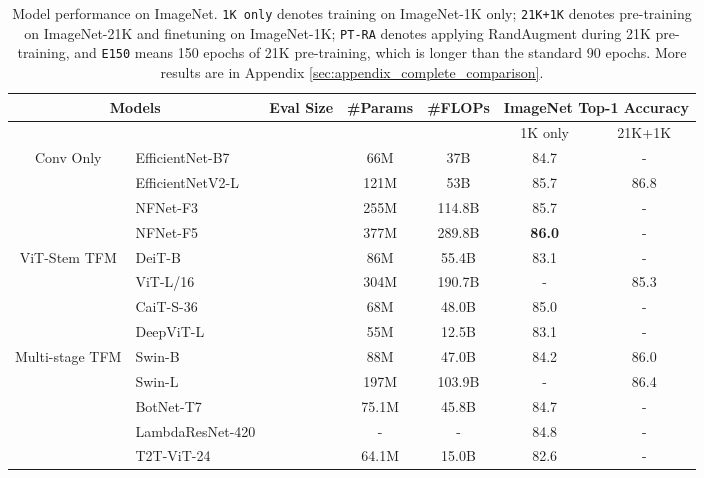\documentclass{article}
\begin{document}
\begin{table}[!ht]
\small
    \centering
    \vspace{-1em}
    \caption{Model performance on ImageNet.  \texttt{1K only} denotes training on ImageNet-1K only; \texttt{21K+1K} denotes pre-training on ImageNet-21K and finetuning on ImageNet-1K; \texttt{PT-RA} denotes applying RandAugment during 21K pre-training, and \texttt{E150} means 150 epochs of 21K pre-training, which is longer than the standard 90 epochs. More results are in Appendix \ref{sec:appendix_complete_comparison}.}
    \begin{tabular}{c l c c c c c}
        \toprule
        \multicolumn{2}{c}{\bf Models} & \bf Eval Size & \bf \#Params & \bf \#FLOPs & \multicolumn{2}{c}{\bf ImageNet Top-1 Accuracy} \\
        \midrule
        \multicolumn{5}{c}{} & 1K only & 21K+1K \vspace{0.5em} \\
        \multirow{3}{*}{Conv Only}
        & EfficientNet-B7 &  & 66M & 37B & 84.7 & -\\
        & EfficientNetV2-L &  & 121M & 53B & 85.7 & 86.8\\
        & NFNet-F3 &  & 255M & 114.8B & 85.7 & - \\
        & NFNet-F5 &  & 377M & 289.8B & \bf 86.0 & - \\
        \cmidrule(r){1-2} \cmidrule(lr){3-3} \cmidrule(lr){4-5} \cmidrule(l){6-6} \cmidrule(l){7-7}
        \multirow{4}{*}{ViT-Stem TFM} 
        & DeiT-B  &  & 86M  & 55.4B & 83.1 & - \\
        & ViT-L/16 &  & 304M  & 190.7B & -  & 85.3 \\
        & CaiT-S-36 &  & 68M & 48.0B & 85.0 & - \\
        & DeepViT-L &  & 55M & 12.5B &  83.1 & - \\
        \cmidrule(r){1-2} \cmidrule(lr){3-3} \cmidrule(lr){4-5} \cmidrule(l){6-6} \cmidrule(l){7-7}
        \multirow{3}{*}{Multi-stage TFM} 
        & Swin-B  &  & 88M  & 47.0B & 84.2  & 86.0 \\
        & Swin-L  &  & 197M & 103.9B & -  & 86.4 \\
        \cmidrule(r){1-2} \cmidrule(lr){3-3} \cmidrule(lr){4-5} \cmidrule(l){6-6} \cmidrule(l){7-7}
        \multirow{5}{*}{Conv+TFM} 
        & BotNet-T7  &  & 75.1M & 45.8B & 84.7 & - \\
        & LambdaResNet-420 &  & - & - & 84.8 & - \\
        & T2T-ViT-24 &  & 64.1M & 15.0B & 82.6 & - \\

\end{tabular}
\end{table}
\end{document}
